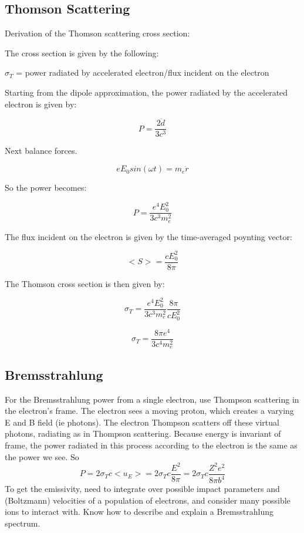 \subsection{Thomson Scattering}

Derivation of the Thomson scattering cross section:

The cross section is given by the following:

$\sigma_T$ = power radiated by accelerated electron/flux incident on the electron

Starting from the dipole approximation, the power radiated by the accelerated electron is given by:

\begin{equation}
P = \frac{2\ddot d}{3c^3}
\end{equation}

Next balance forces. 

\begin{equation}
eE_0sin(\omega t) = m_e\ddot r
\end{equation}

So the power becomes:

\begin{equation}
P = \frac{e^4E_0^2}{3c^3m_e^2}
\end{equation}

The flux incident on the electron is given by the time-averaged poynting vector:

\begin{equation}
<S> = \frac{cE_0^2}{8\pi}
\end{equation}

The Thomson cross section is then given by:

\begin{equation}
\sigma_T = \frac{e^4E_0^2}{3c^3m_e^2}\frac{8\pi}{cE_0^2}
\end{equation}

\begin{equation}
\sigma_T = \frac{8\pi e^4}{3c^4m_e^2}
\end{equation}

\subsection{Bremsstrahlung}
For the Bremsstrahlung power from a single electron, use Thompson scattering in the electron's 
frame.  The electron sees a moving proton, which creates a varying E and B field (ie photons).  
The electron Thompson scatters off these virtual photons, radiating as in Thompson scattering.
Because energy is invariant of frame, the power radiated in this process according to the 
electron is the same as the power we see.  So
\begin{displaymath}P=2\sigma_Tc<u_E>=2\sigma_Tc\frac{E^2}{8\pi}=2\sigma_Tc\frac{Z^2e^2}{8\pi b^4}\end{displaymath}
To get the emissivity, need to integrate over possible impact parameters and (Boltzmann) 
velocities of a population of electrons, and consider many possible ions to interact with.  
Know how to describe and explain a Bremsstrahlung spectrum.

